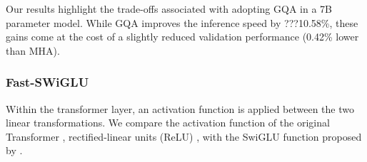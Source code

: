 


Our results highlight the trade-offs associated with adopting GQA in a 7B parameter model. While GQA improves the inference speed by ???10.58\%, these gains come at the cost of a slightly reduced validation performance (0.42\% lower than MHA).

\subsubsection{Fast-SWiGLU}
Within the transformer layer, an activation function is applied between the two linear transformations. We compare the activation function of the original Transformer \cite{transformers}, rectified-linear units (ReLU) \cite{relu}, with the SwiGLU function proposed by \citet{swiglu}.

